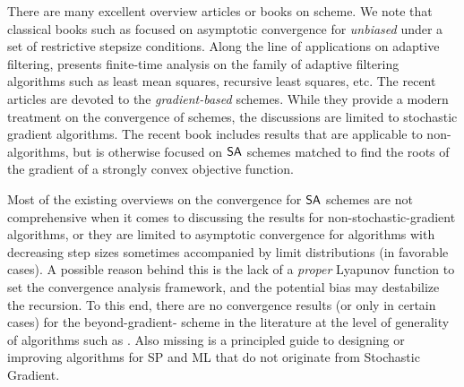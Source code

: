 \documentclass[10pt,twocolumn,twoside]{IEEEtran}
\begin{document}
There are many excellent overview articles or books on {\SA} scheme. We note that classical books such as \cite{kushner2003stochastic,benveniste2012adaptive, borkar2009stochastic} 
focused on asymptotic convergence for \emph{unbiased} {\SA} under a set of restrictive stepsize conditions. 
Along the line of applications on adaptive filtering, \cite{sayed2011adaptive} presents finite-time analysis on the family of adaptive filtering algorithms such as least mean squares, recursive least squares, etc. The recent articles \cite{cevher2014convex, bottou2018optimization, lan2020first} are devoted to the \emph{gradient-based} {\SA} schemes. While they provide a modern treatment on the convergence of {\SA} schemes, the discussions are limited to stochastic gradient algorithms. 
The recent book \cite{meyn2022book} includes results that are applicable to non-{\SG} algorithms, but is otherwise focused on $\textsf{SA}$ schemes matched to find the roots of the gradient of a strongly convex objective function. 

Most of the existing overviews on the convergence for $\textsf{SA}$ schemes are not comprehensive when it comes to discussing the results for non-stochastic-gradient algorithms, or they are limited to asymptotic convergence for algorithms with decreasing step sizes sometimes accompanied by limit distributions (in favorable cases).
A possible reason behind this is the lack of a \emph{proper} Lyapunov function to set the convergence analysis framework, and the potential bias may destabilize the {\SA} recursion.
To this end, there are no convergence results  (or only in certain cases)  for the beyond-gradient-{\SA} scheme in the literature at the level of generality of {\SG} algorithms such as \cite{lan2020first}.
Also missing is a principled guide to designing or improving algorithms for SP and ML that do not originate from Stochastic Gradient.
\end{document}
